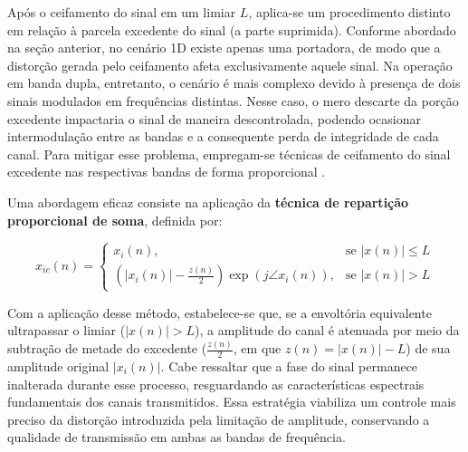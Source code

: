 Após o ceifamento do sinal em um limiar $L$, aplica-se um procedimento distinto em relação à parcela excedente do sinal (a parte suprimida). Conforme abordado na seção anterior, no cenário 1D existe apenas uma portadora, de modo que a distorção gerada pelo ceifamento afeta exclusivamente aquele sinal. Na operação em banda dupla, entretanto, o cenário é mais complexo devido à presença de dois sinais modulados em frequências distintas. Nesse caso, o mero descarte da porção excedente impactaria o sinal de maneira descontrolada, podendo ocasionar intermodulação entre as bandas e a consequente perda de integridade de cada canal. Para mitigar esse problema, empregam-se técnicas de ceifamento do sinal excedente nas respectivas bandas de forma proporcional \cite{artigo2}. 

Uma abordagem eficaz consiste na aplicação da \textbf{técnica de repartição proporcional de soma}, definida por:

\begin{equation}
	x_{ic}(n) = 
	\begin{cases}
		x_i(n), & \text{se } |x(n)| \leq L \\[6pt]
		\left( |x_i(n)| - \frac{z(n)}{2} \right) \exp(j\angle x_i(n)), & \text{se } |x(n)| > L
	\end{cases}
\end{equation}

Com a aplicação desse método, estabelece-se que, se a envoltória equivalente ultrapassar o limiar ($|x(n)| > L$), a amplitude do canal é atenuada por meio da subtração de metade do excedente ($\frac{z(n)}{2}$, em que $z(n) = |x(n)| - L$) de sua amplitude original $|x_i(n)|$. Cabe ressaltar que a fase do sinal permanece inalterada durante esse processo, resguardando as características espectrais fundamentais dos canais transmitidos. Essa estratégia viabiliza um controle mais preciso da distorção introduzida pela limitação de amplitude, conservando a qualidade de transmissão em ambas as bandas de frequência.

